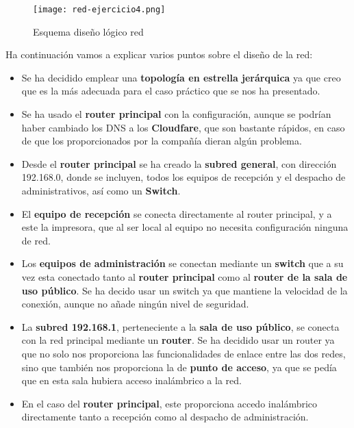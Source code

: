     \begin{figure}[ht]
    \centering
    \texttt{[image: red-ejercicio4.png]}
    \caption{Esquema diseño lógico red}
\end{figure}

Ha continuación vamos a explicar varios puntos sobre el diseño de la red:

\begin{itemize}
    \item Se ha decidido emplear una \textbf{topología en estrella jerárquica} ya que creo que es la más adecuada para el caso práctico que se nos ha presentado.
    \item Se ha usado el \textbf{router principal} con la configuración, aunque se podrían haber cambiado los DNS a los \textbf{Cloudfare}, que son bastante rápidos, en caso de que los proporcionados por la compañía dieran algún problema.
    \item Desde el \textbf{router principal} se ha creado la \textbf{subred general}, con dirección 192.168.0, donde se incluyen, todos los equipos de recepción y el despacho de administrativos, así como un \textbf{Switch}.
    \item El \textbf{equipo de recepción} se conecta directamente al router principal, y a este la impresora, que al ser local al equipo no necesita configuración ninguna de red.
    \item Los \textbf{equipos de administración} se conectan mediante un \textbf{switch} que a su vez esta conectado tanto al \textbf{router principal} como al \textbf{router de la sala de uso público}. Se ha decido usar un switch ya que mantiene la velocidad de la conexión, aunque no añade ningún nivel de seguridad.
    \item La \textbf{subred 192.168.1}, perteneciente a la \textbf{sala de uso público}, se conecta con la red principal mediante un \textbf{router}. Se ha decidido usar un router ya que no solo nos proporciona las funcionalidades de enlace entre las dos redes, sino que también nos proporciona la de \textbf{punto de acceso}, ya que se pedía que en esta sala hubiera acceso inalámbrico a la red.
    \item En el caso del \textbf{router principal}, este proporciona accedo inalámbrico directamente tanto a recepción como al despacho de administración.
\end{itemize}

\newpage




